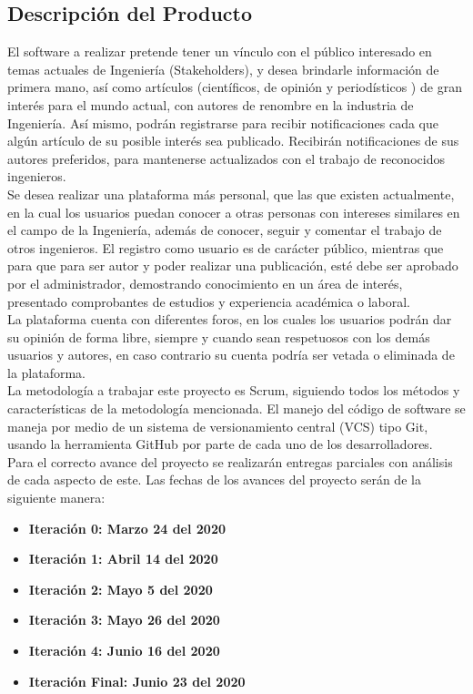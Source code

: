 \documentclass[a4paper,12 pt]{article}
\begin{document}
\subsection{Descripción del Producto}

El software a realizar pretende tener un vínculo con el público interesado en temas
actuales de Ingeniería (Stakeholders), y desea brindarle información de primera mano,
así como artículos (científicos, de opinión y periodísticos ) de gran interés para el
mundo actual, con autores de renombre en la industria de Ingeniería. Así mismo, podrán
registrarse para recibir notificaciones cada que algún artículo de su posible interés
sea publicado. Recibirán notificaciones de sus autores preferidos, para mantenerse
actualizados con el trabajo de reconocidos ingenieros.\\

Se desea realizar una plataforma más personal, que las que existen actualmente, en la
cual los usuarios puedan conocer a otras personas con intereses similares en el campo
de la Ingeniería, además de conocer, seguir y comentar el trabajo de otros ingenieros.
El registro como usuario es de carácter público, mientras que para que para ser autor y
poder realizar una publicación, esté debe ser aprobado por el administrador,
demostrando conocimiento en un área de interés, presentado comprobantes de estudios y
experiencia académica o laboral.\\

La plataforma cuenta con diferentes foros, en los cuales los usuarios podrán dar su
opinión de forma libre, siempre y cuando sean respetuosos con los demás usuarios y
autores, en caso contrario su cuenta podría ser vetada o eliminada de la plataforma. \\

La metodología a trabajar este proyecto es Scrum, siguiendo todos los métodos y
características de la metodología mencionada. El manejo del código de software se
maneja por medio de un sistema de versionamiento central (VCS) tipo Git, usando la
herramienta GitHub por parte de cada uno de los desarrolladores. \\

Para el correcto avance del proyecto se realizarán entregas parciales con análisis de
cada aspecto de este. Las fechas de los avances del proyecto serán de la siguiente
manera:

\begin{itemize}
    \item \textbf{Iteración 0: Marzo 24 del 2020} 
    \item \textbf{Iteración 1: Abril 14 del 2020} 
    \item \textbf{Iteración 2: Mayo 5 del 2020} 
    \item \textbf{Iteración 3: Mayo 26 del 2020}
    \item \textbf{Iteración 4: Junio 16 del 2020} 
    \item \textbf{Iteración Final: Junio 23 del 2020} 
\end{itemize}{}
\end{document}
